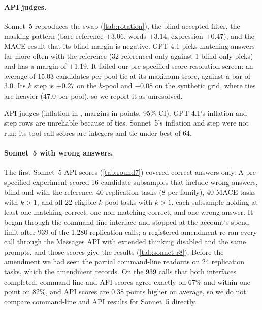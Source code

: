 \paragraph{API judges.}
Sonnet~5 reproduces the swap (\cref{tab:rotation}), the blind-accepted filter, the masking pattern (bare reference $+3.06$, words $+3.14$, expression $+0.47$), and the \textsc{MACE} result that its blind margin is negative. GPT-4.1 picks matching answers far more often with the reference (32 referenced-only against 1 blind-only picks) and has a margin of $+1.19$. It failed our pre-specified score-resolution screen: an average of 15.03 candidates per pool tie at its maximum score, against a bar of 3.0. Its $k$ step is $+0.27$  on the $k$-pool and $-0.08$  on the synthetic grid, where ties are heavier (47.0 per pool), so we report it as unresolved.

\begin{table}[htbp]
\centering
\caption{API judges (inflation in \sd, margins in points, 95\% CI). GPT-4.1's inflation and step rows are unreliable because of ties. Sonnet~5's inflation and step were not run: its tool-call scores are integers and tie under best-of-64.\pre}
\label{tab:frontier-api}
\footnotesize
\begin{adjustbox}{max width=\linewidth}\end{adjustbox}

\end{table}

\paragraph{Sonnet~5 with wrong answers.}
The first Sonnet~5 API scores (\cref{tab:round7}) covered correct answers only. A pre-specified experiment scored 16-candidate subsamples that include wrong answers, blind and with the reference: 40 replication tasks (8 per family), 40 \textsc{MACE} tasks with $k{>}1$, and all 22 eligible $k$-pool tasks with $k{>}1$, each subsample holding at least one matching-correct, one non-matching-correct, and one wrong answer. It began through the command-line interface and stopped at the account's spend limit after 939 of the 1,280 replication calls; a registered amendment re-ran every call through the Messages API with extended thinking disabled and the same prompts, and those scores give the results (\cref{tab:sonnet-r8}).\pre{} Before the amendment we had seen the partial command-line readouts on 24 replication tasks, which the amendment records. On the 939 calls that both interfaces completed, command-line and API scores agree exactly on 67\% and within one point on 82\%, and API scores are 0.38 points higher on average, so we do not compare command-line and API results for Sonnet~5 directly.\ph

